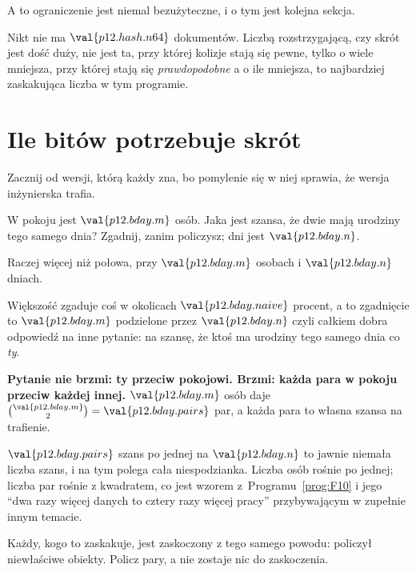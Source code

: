 \begin{fr}
A to ograniczenie jest niemal bezużyteczne, i o tym jest kolejna sekcja.

Nikt nie ma $\val{p12.hash.n64}$ dokumentów. Liczbą rozstrzygającą, czy skrót
jest dość duży, nie jest ta, przy której kolizje stają się pewne, tylko o
wiele mniejsza, przy której stają się \emph{prawdopodobne} \dash{} a o ile
mniejsza, to najbardziej zaskakująca liczba w tym programie.
\end{fr}

\section{Ile bitów potrzebuje skrót}
\label{sec:P12-birthday}

\begin{fr}
Zacznij od wersji, którą każdy zna, bo pomylenie się w niej sprawia, że wersja
inżynierska trafia.

W pokoju jest $\val{p12.bday.m}$ osób. Jaka jest szansa, że dwie mają
urodziny tego samego dnia? Zgadnij, zanim policzysz; dni jest
$\val{p12.bday.n}$.
\dotline
\nextframe
\end{fr}

\begin{fr}
Raczej więcej niż połowa, przy $\val{p12.bday.m}$ osobach i
$\val{p12.bday.n}$ dniach.

Większość zgaduje coś w okolicach $\val{p12.bday.naive}$ procent, a to
zgadnięcie to $\val{p12.bday.m}$ podzielone przez $\val{p12.bday.n}$ \dash{}
czyli całkiem dobra odpowiedź na inne pytanie: na szansę, że ktoś ma urodziny
tego samego dnia co \emph{ty}.

\begin{trapbox}
\textbf{Pytanie nie brzmi: ty przeciw pokojowi. Brzmi: każda para w pokoju
przeciw każdej innej.} $\val{p12.bday.m}$ osób daje
$\binom{\val{p12.bday.m}}{2} = \val{p12.bday.pairs}$ par, a każda para to
własna szansa na trafienie.

$\val{p12.bday.pairs}$ szans po jednej na $\val{p12.bday.n}$ to jawnie niemała
liczba szans, i na tym polega cała niespodzianka. Liczba osób rośnie po
jednej; liczba par rośnie z kwadratem, co jest wzorem
z~Programu~\ref{prog:F10} i jego \enquote{dwa razy więcej danych to cztery
razy więcej pracy} przybywającym w zupełnie innym temacie.

Każdy, kogo to zaskakuje, jest zaskoczony z tego samego powodu: policzył
niewłaściwe obiekty. Policz pary, a nie zostaje nic do zaskoczenia.
\end{trapbox}

\end{fr}

